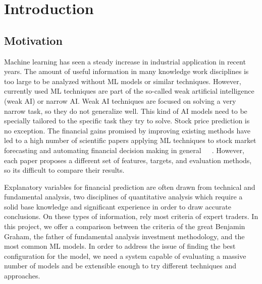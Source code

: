 \chapter{Introduction} 
\label{chap:introduction}  


\newcommand{\keyword}[1]{\textbf{#1}}
\newcommand{\tabhead}[1]{\textbf{#1}}
\newcommand{\code}[1]{\texttt{#1}}
\newcommand{\file}[1]{\texttt{\bfseries#1}}
\newcommand{\option}[1]{\texttt{\itshape#1}}


\section{Motivation}

Machine learning has seen a steady increase in industrial application in recent  years. The amount of useful information in many knowledge work disciplines is too large to be analyzed without ML models or similar techniques. However, currently used ML techniques are part of the so-called weak artificial intelligence (weak AI) or narrow AI. Weak AI techniques are focused on solving a very narrow task, so they do not generalize well. This kind of AI models need to be specially tailored to the specific task they try to solve. Stock price prediction is no exception. The  financial gains promised by improving existing methods have led to a high number of scientific papers applying ML techniques to stock market forecasting and automating financial decision making in general~\cite{fischer2018deep}~\cite{krauss2017deep}~\cite{ballings2015evaluating}. However, each paper proposes a different set of features, targets, and evaluation methods, so its difficult to compare their results.

Explanatory variables for financial prediction are often drawn from technical and fundamental analysis, two disciplines of quantitative analysis which require a solid base knowledge and significant experience in order to draw accurate conclusions. On these types of information, rely most criteria of expert traders. In this project, we offer a comparison between the criteria of the great Benjamin Graham, the father of fundamental analysis investment methodology,  and the most common ML models. In order to address the issue of finding the best configuration for the model, we need a system capable of evaluating a massive number of models and be extensible enough to try different techniques and approaches. 


